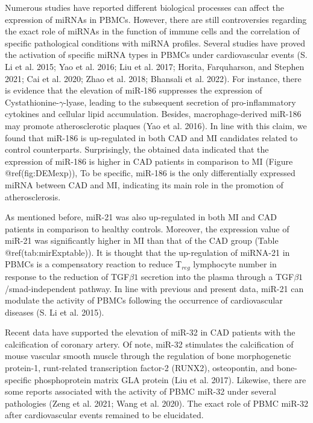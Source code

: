 \documentclass[smallextended]{svjour3}       %
\begin{document}
Numerous studies have reported different biological processes can affect
the expression of miRNAs in PBMCs. However, there are still
controversies regarding the exact role of miRNAs in the function of
immune cells and the correlation of specific pathological conditions
with miRNA profiles. Several studies have proved the activation of
specific miRNA types in PBMCs under cardiovascular events (S. Li et al.
2015; Yao et al. 2016; Liu et al. 2017; Horita, Farquharson, and Stephen
2021; Cai et al. 2020; Zhao et al. 2018; Bhansali et al. 2022). For
instance, there is evidence that the elevation of miR-186 suppresses the
expression of Cystathionine-\(\gamma\)-lyase, leading to the subsequent
secretion of pro-inflammatory cytokines and cellular lipid accumulation.
Besides, macrophage-derived miR-186 may promote atherosclerotic plaques
(Yao et al. 2016). In line with this claim, we found that miR-186 is
up-regulated in both CAD and MI candidates related to control
counterparts. Surprisingly, the obtained data indicated that the
expression of miR-186 is higher in CAD patients in comparison to MI
(Figure @ref(fig:DEMexp)), To be specific, miR-186 is the only
differentially expressed miRNA between CAD and MI, indicating its main
role in the promotion of atherosclerosis.

As mentioned before, miR-21 was also up-regulated in both MI and CAD
patients in comparison to healthy controls. Moreover, the expression
value of miR-21 was significantly higher in MI than that of the CAD
group (Table @ref(tab:mirExptable)). It is thought that the
up-regulation of miRNA-21 in PBMCs is a compensatory reaction to reduce
T\(_{reg}\) lymphocyte number in response to the reduction of
TGF\(\beta1\) secretion into the plasma through a
TGF\(\beta1\)/smad-independent pathway. In line with previous and
present data, miR-21 can modulate the activity of PBMCs following the
occurrence of cardiovascular diseases (S. Li et al. 2015).

Recent data have supported the elevation of miR-32 in CAD patients with
the calcification of coronary artery. Of note, miR-32 stimulates the
calcification of mouse vascular smooth muscle through the regulation of
bone morphogenetic protein-1, runt-related transcription factor-2
(RUNX2), osteopontin, and bone-specific phosphoprotein matrix GLA
protein (Liu et al. 2017). Likewise, there are some reports associated
with the activity of PBMC miR-32 under several pathologies (Zeng et al.
2021; Wang et al. 2020). The exact role of PBMC miR-32 after
cardiovascular events remained to be elucidated.
\end{document}
